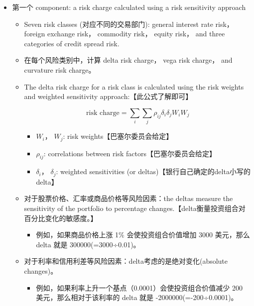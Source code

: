     
\begin{itemize}
\item 第一个 component: a risk charge calculated using a risk sensitivity approach
      \begin{itemize}
        \item Seven risk classes (对应不同的交易部门): general interest rate risk， foreign exchange risk， commodity risk， equity risk， and three categories of credit spread risk.
        \item 在每个风险类别中，计算 delta risk charge， vega risk charge， and curvature risk charge。
        \end{itemize}

        \begin{itemize}

\item[A.] The delta risk charge for a risk class is calculated using the risk weights and weighted sensitivity approach:【此公式了解即可】
        
        \[ \text{risk charge} = \sum_i \sum_j \rho_{ij}\delta_i\delta_jW_iW_j \]
        \begin{itemize}

    \item $W_i$， $W_j$: risk weights【巴塞尔委员会给定】
    \item $\rho_{ij}$: correlations between risk factors【巴塞尔委员会给定】
    \item $\delta_i$， $\delta_j$: weighted sensitivities (or deltas)【银行自己确定的delta小写的delta】
        \end{itemize}

\item 对于股票价格、汇率或商品价格等风险因素：the deltas measure the sensitivity of the portfolio to percentage changes.【delta衡量投资组合对百分比变化的敏感度。】
    \begin{itemize}
    \item 例如，如果商品价格上涨 1\% 会使投资组合价值增加 3000 美元，那么 delta 就是 300000(=3000÷0.01)。
    \end{itemize}
        
\item 对于利率和信用利差等风险因素：delta考虑的是绝对变化(absolute changes)。
    \begin{itemize}
    \item 例如，如果利率上升一个基点（0.0001）会使投资组合价值减少 200 美元，那么相对于该利率的 delta 就是 -2000000(=-200÷0.0001)。
    \end{itemize}
        

\end{itemize}
\end{itemize}
